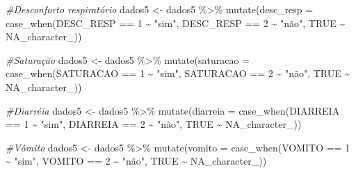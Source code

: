 \documentclass[
]{article}
\newenvironment{Shaded}{\begin{snugshade}}{\end{snugshade}}
\newcommand{\AttributeTok}[1]{\textcolor[rgb]{0.77,0.63,0.00}{#1}}
\newcommand{\CommentTok}[1]{\textcolor[rgb]{0.56,0.35,0.01}{\textit{#1}}}
\newcommand{\ConstantTok}[1]{\textcolor[rgb]{0.00,0.00,0.00}{#1}}
\newcommand{\DecValTok}[1]{\textcolor[rgb]{0.00,0.00,0.81}{#1}}
\newcommand{\FunctionTok}[1]{\textcolor[rgb]{0.00,0.00,0.00}{#1}}
\newcommand{\NormalTok}[1]{#1}
\newcommand{\OtherTok}[1]{\textcolor[rgb]{0.56,0.35,0.01}{#1}}
\newcommand{\SpecialCharTok}[1]{\textcolor[rgb]{0.00,0.00,0.00}{#1}}
\newcommand{\StringTok}[1]{\textcolor[rgb]{0.31,0.60,0.02}{#1}}
\begin{document}
\begin{Shaded}
\begin{Highlighting}[]
\CommentTok{\#Desconforto respiratório}
\NormalTok{dados5 }\OtherTok{\textless{}{-}}\NormalTok{  dados5 }\SpecialCharTok{\%\textgreater{}\%}
  \FunctionTok{mutate}\NormalTok{(}\AttributeTok{desc\_resp =} \FunctionTok{case\_when}\NormalTok{(DESC\_RESP }\SpecialCharTok{==} \DecValTok{1} \SpecialCharTok{\textasciitilde{}} \StringTok{"sim"}\NormalTok{,}
\NormalTok{                               DESC\_RESP }\SpecialCharTok{==} \DecValTok{2} \SpecialCharTok{\textasciitilde{}} \StringTok{"não"}\NormalTok{,}
                               \ConstantTok{TRUE} \SpecialCharTok{\textasciitilde{}} \ConstantTok{NA\_character\_}\NormalTok{))}

\CommentTok{\#Saturação}
\NormalTok{dados5 }\OtherTok{\textless{}{-}}\NormalTok{  dados5 }\SpecialCharTok{\%\textgreater{}\%}
  \FunctionTok{mutate}\NormalTok{(}\AttributeTok{saturacao =} \FunctionTok{case\_when}\NormalTok{(SATURACAO }\SpecialCharTok{==} \DecValTok{1} \SpecialCharTok{\textasciitilde{}} \StringTok{"sim"}\NormalTok{,}
\NormalTok{                               SATURACAO }\SpecialCharTok{==} \DecValTok{2} \SpecialCharTok{\textasciitilde{}} \StringTok{"não"}\NormalTok{,}
                               \ConstantTok{TRUE} \SpecialCharTok{\textasciitilde{}} \ConstantTok{NA\_character\_}\NormalTok{))}

\CommentTok{\#Diarréia}
\NormalTok{dados5 }\OtherTok{\textless{}{-}}\NormalTok{  dados5 }\SpecialCharTok{\%\textgreater{}\%}
  \FunctionTok{mutate}\NormalTok{(}\AttributeTok{diarreia =} \FunctionTok{case\_when}\NormalTok{(DIARREIA }\SpecialCharTok{==} \DecValTok{1} \SpecialCharTok{\textasciitilde{}} \StringTok{"sim"}\NormalTok{,}
\NormalTok{                              DIARREIA }\SpecialCharTok{==} \DecValTok{2} \SpecialCharTok{\textasciitilde{}} \StringTok{"não"}\NormalTok{,}
                              \ConstantTok{TRUE} \SpecialCharTok{\textasciitilde{}} \ConstantTok{NA\_character\_}\NormalTok{))}

\CommentTok{\#Vômito}
\NormalTok{dados5 }\OtherTok{\textless{}{-}}\NormalTok{  dados5 }\SpecialCharTok{\%\textgreater{}\%}
  \FunctionTok{mutate}\NormalTok{(}\AttributeTok{vomito =} \FunctionTok{case\_when}\NormalTok{(VOMITO }\SpecialCharTok{==} \DecValTok{1} \SpecialCharTok{\textasciitilde{}} \StringTok{"sim"}\NormalTok{,}
\NormalTok{                            VOMITO }\SpecialCharTok{==} \DecValTok{2} \SpecialCharTok{\textasciitilde{}} \StringTok{"não"}\NormalTok{,}
                            \ConstantTok{TRUE} \SpecialCharTok{\textasciitilde{}} \ConstantTok{NA\_character\_}\NormalTok{))}


\end{Highlighting}
\end{Shaded}
\end{document}
